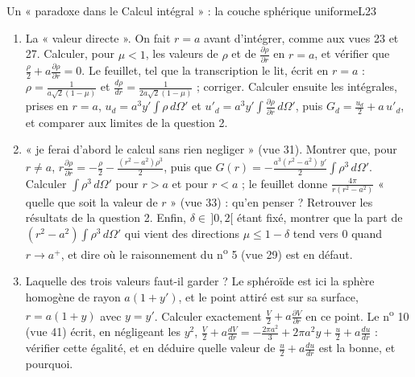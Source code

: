 \documentclass[11pt,a4paper]{article}
\begin{document}
\begin{exercice}{Un « paradoxe dans le Calcul intégral » : la couche sphérique uniforme}{L2}{3}
\begin{enumerate}
  et pour la quantité $\frac u2 + a\frac{\partial u}{\partial r}$ du feuillet. Laquelle
  de ces limites le feuillet trouve-t-il aux vues 25 et 33 ?
\item La « valeur directe ». On fait $r = a$ avant d'intégrer, comme aux vues 23
  et 27. Calculer, pour $\mu < 1$, les valeurs de $\rho$ et de
  $\frac{\partial\rho}{\partial r}$ en $r = a$, et vérifier que
  $\frac\rho2 + a\frac{\partial\rho}{\partial r} = 0$. Le feuillet, tel que la
  transcription le lit, écrit en $r = a$ : $\rho = \frac{1}{a\sqrt2(1-\mu)}$ et
  $\frac{d\rho}{dr} = \frac{1}{2a\sqrt2(1-\mu)}$ ; corriger. Calculer ensuite les
  intégrales, prises en $r = a$, $u_d = a^3y'\int\rho\,d\Omega'$ et
  $u'_d = a^3y'\int\frac{\partial\rho}{\partial r}\,d\Omega'$, puis
  $G_d = \frac{u_d}{2} + a\,u'_d$, et comparer aux limites de la question 2.
\item « je ferai d'abord le calcul sans rien negliger » (vue 31). Montrer que, pour
  $r \ne a$, $r\frac{\partial\rho}{\partial r} = -\frac\rho2 - \frac{(r^2-a^2)\rho^3}{2}$,
  puis que $G(r) = -\frac{a^3(r^2-a^2)\,y'}{2}\int\rho^3\,d\Omega'$. Calculer
  $\int\rho^3\,d\Omega'$ pour $r > a$ et pour $r < a$ ; le feuillet donne
  $\frac{4\pi}{r(r^2-a^2)}$ « quelle que soit la valeur de $r$ » (vue 33) : qu'en
  penser ? Retrouver les résultats de la question 2. Enfin, $\delta \in\, ]0,2[$ étant
  fixé, montrer que la part de $(r^2-a^2)\int\rho^3\,d\Omega'$ qui vient des
  directions $\mu \le 1 - \delta$ tend vers $0$ quand $r \to a^+$, et dire où le
  raisonnement du n\textsuperscript{o} 5 (vue 29) est en défaut.
\item Laquelle des trois valeurs faut-il garder ? Le sphéroïde est ici la sphère
  homogène de rayon $a(1+y')$, et le point attiré est sur sa surface,
  $r = a(1+y)$ avec $y = y'$. Calculer exactement
  $\frac V2 + a\frac{\partial V}{\partial r}$ en ce point. Le n\textsuperscript{o} 10
  (vue 41) écrit, en négligeant les $y^2$,
  $\frac V2 + a\frac{dV}{dr} = -\frac{2\pi a^2}{3} + 2\pi a^2y + \frac u2 + a\frac{du}{dr}$ :
  vérifier cette égalité, et en déduire quelle valeur de
  $\frac u2 + a\frac{du}{dr}$ est la bonne, et pourquoi.
\end{enumerate}
\end{exercice}
\end{document}
